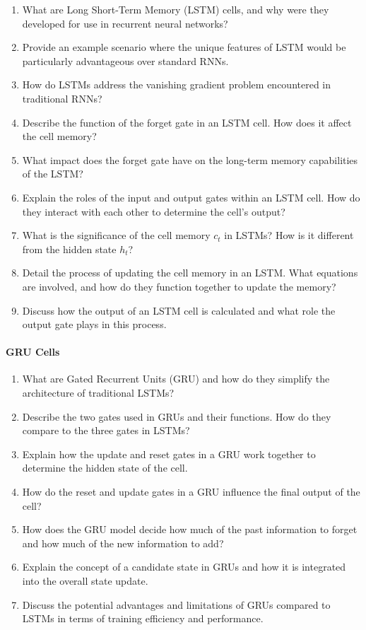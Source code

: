 \begin{enumerate}
	\item What are Long Short-Term Memory (LSTM) cells, and why were they developed for use in recurrent neural networks?
	\item Provide an example scenario where the unique features of LSTM would be particularly advantageous over standard RNNs.
	\item How do LSTMs address the vanishing gradient problem encountered in traditional RNNs?
	\item Describe the function of the forget gate in an LSTM cell. How does it affect the cell memory?
	\item What impact does the forget gate have on the long-term memory capabilities of the LSTM?
	\item Explain the roles of the input and output gates within an LSTM cell. How do they interact with each other to determine the cell's output?
	\item What is the significance of the cell memory $c_t$ in LSTMs? How is it different from the hidden state $h_t$?
	\item Detail the process of updating the cell memory in an LSTM. What equations are involved, and how do they function together to update the memory?
	\item Discuss how the output of an LSTM cell is calculated and what role the output gate plays in this process.
\end{enumerate}

\paragraph*{GRU Cells}

\begin{enumerate}
	\item What are Gated Recurrent Units (GRU) and how do they simplify the architecture of traditional LSTMs?
	\item Describe the two gates used in GRUs and their functions. How do they compare to the three gates in LSTMs?
	\item Explain how the update and reset gates in a GRU work together to determine the hidden state of the cell.
	\item How do the reset and update gates in a GRU influence the final output of the cell?
	\item How does the GRU model decide how much of the past information to forget and how much of the new information to add?
	\item Explain the concept of a candidate state in GRUs and how it is integrated into the overall state update.
	\item Discuss the potential advantages and limitations of GRUs compared to LSTMs in terms of training efficiency and performance.
\end{enumerate}

